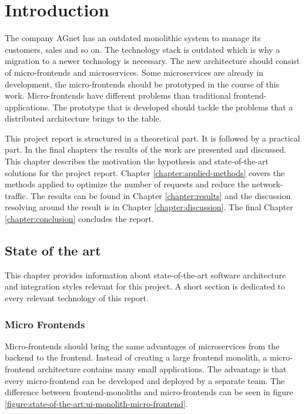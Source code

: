 \chapter{Introduction}\label{chapter:introduction}
 
The company AGnet has an outdated monolithic system to manage its customers, sales and so on. The technology stack is outdated which is why a migration to a newer technology is necessary. The new architecture should consist of micro-frontends and microservices. Some microservices are already in development, the micro-frontends should be prototyped in the course of this work. Micro-frontends have different problems than traditional frontend-applications. The prototype that is developed should tackle the problems that a distributed architecture brings to the table.
 
This project report is structured in a theoretical part. It is followed by a practical part. In the final chapters the results of the work are presented and discussed. This chapter describes the motivation the hypothesis and state-of-the-art solutions for the project report. Chapter \ref{chapter:applied-methods} covers the methods applied to optimize the number of requests and reduce the network-traffic. The results can be found in Chapter \ref{chapter:results} and the discussion resolving around the result is in Chapter \ref{chapter:discussion}. The final Chapter \ref{chapter:conclusion} concludes the report.

\section{State of the art}

This chapter provides information about state-of-the-art software architecture and integration styles relevant for this project. A short section is dedicated to every relevant technology of this report.

\subsection{Micro Frontends}

Micro-frontends should bring the same advantages of microservices from the backend to the frontend. Instead of creating a large frontend monolith, a micro-frontend architecture contains many small applications. The advantage is that every micro-frontend can be developed and deployed by a separate team. \cite{book:2020:geers:micro-frontends-in-action} The difference between frontend-monoliths and micro-frontends can be seen in figure \ref{figure:state-of-the-art:ui-monolith-micro-frontend}.

